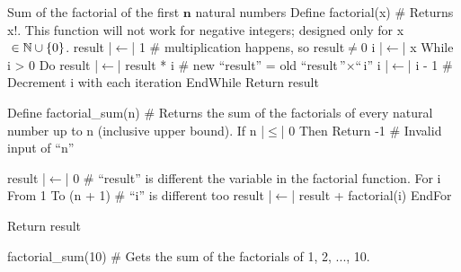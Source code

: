 \documentclass[12pt,a4paper,titlepage]{article}
\DeclarePairedDelimiter {\curls} { \{      }     { \}      }
\begin{document}
\begin{SummaryBox}[title=Concepts of pseudocode, breakable]
                \begin{SummaryExtensionBox}[title=All concepts used in conjunction]
                    \begin{codebox}{Sum of the factorial of the first \( \bm{n} \) natural numbers}
                        Define factorial(x)
                            # Returns x$!$. This function will not work for negative integers; designed only for x${} \in \mathbb{N} \cup \curls{0}$.
                            result |\( \leftarrow \)| 1  # multiplication happens, so result${} \neq 0$
                            i |\( \leftarrow \)| x
                            While i > 0 Do
                                result |\( \leftarrow \)| result * i  # new $\text{``}$result$\text{''}$ = old $\text{``}$result$\text{''} \times \text{``}$i$\text{''}$
                                i |\( \leftarrow \)| i - 1  # Decrement i with each iteration
                            EndWhile
                            Return result
                        
                        Define factorial_sum(n)
                            # Returns the sum of the factorials of every natural number up to n (inclusive upper bound).
                            If n |\( \leq \)| 0 Then
                                Return -1  # Invalid input of $\text{``}$n$\text{''}$
                            
                            result |\( \leftarrow \)| 0  # $\text{``}$result$\text{''}$ is different the variable in the factorial function.
                            For i From 1 To (n + 1)  # $\text{``}$i$\text{''}$ is different too
                                result |\( \leftarrow \)| result + factorial(i)
                            EndFor
    
                            Return result
                        
                        factorial_sum(10)  # Gets the sum of the factorials of 1, 2, ..., 10.
                    \end{codebox}
                \end{SummaryExtensionBox}
            \end{SummaryBox}
            
\end{document}
